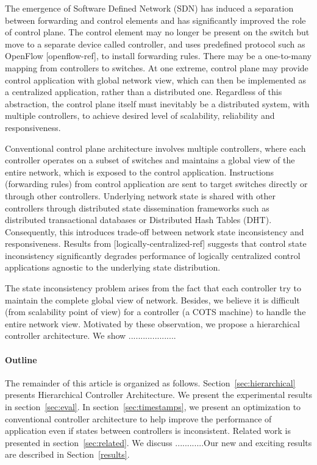 \documentclass[10pt, twocolumn]{article}
\begin{document}
The emergence of Software Defined Network (SDN) has induced a separation between forwarding and control elements and has significantly improved the role of control plane. The control element may no longer be present on the switch but move to a separate device called controller, and uses predefined protocol such as OpenFlow [openflow-ref], to install forwarding rules. There may be a one-to-many mapping from controllers to switches. At one extreme, control plane may provide control application with global network view, which can then be implemented as a centralized application, rather than a distributed one. Regardless of this abstraction, the control plane itself must inevitably be a distributed system, with multiple controllers, to achieve desired level of scalability, reliability and responsiveness.                    

Conventional control plane architecture involves multiple controllers, where each controller operates on a subset of switches and maintains a global view of the entire network, which is exposed to the control application. Instructions (forwarding rules) from control application are sent to target switches directly or through other controllers. Underlying network state is shared with other controllers through distributed state dissemination frameworks such as distributed transactional databases or Distributed Hash Tables (DHT). Consequently, this introduces trade-off between network state inconsistency and responsiveness. Results from [logically-centralized-ref] suggests that control state inconsistency significantly degrades performance of logically centralized control applications agnostic to the underlying state distribution. 

The state inconsistency problem arises from the fact that each controller try to maintain the complete global view of network. Besides, we believe it is difficult (from scalability point of view) for a controller (a COTS machine) to handle the entire network view. Motivated by these observation, we propose a hierarchical controller architecture. We show ....................   
 

\paragraph{Outline}
The remainder of this article is organized as follows. Section~\ref{sec:hierarchical} presents Hierarchical Controller Architecture. We present the experimental results in section~\ref{sec:eval}. In section~\ref{sec:timestamps}, we present an optimization to conventional controller architecture to help improve the performance of application even if states between controllers is inconsistent. Related work is presented in section~\ref{sec:related}. We discuss ............Our new and exciting results are described in Section~\ref{results}.
\end{document}
